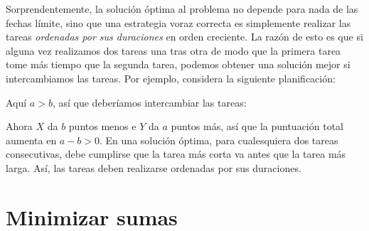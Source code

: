Sorprendentemente, la solución óptima al problema
no depende para nada de las fechas límite,
sino que una estrategia voraz correcta es simplemente
realizar las tareas \emph{ordenadas por sus duraciones}
en orden creciente.
La razón de esto es que si alguna vez realizamos
dos tareas una tras otra de modo que la primera tarea
tome más tiempo que la segunda tarea,
podemos obtener una solución mejor si intercambiamos las tareas.
Por ejemplo, considera la siguiente planificación:
\begin{center}
\end{center}
Aquí $a>b$, así que deberíamos intercambiar las tareas:
\begin{center}
\end{center}
Ahora $X$ da $b$ puntos menos e $Y$ da $a$ puntos más,
así que la puntuación total aumenta en $a-b > 0$.
En una solución óptima,
para cualesquiera dos tareas consecutivas,
debe cumplirse que la tarea más corta va
antes que la tarea más larga.
Así, las tareas deben realizarse
ordenadas por sus duraciones.

\section{Minimizar sumas}

